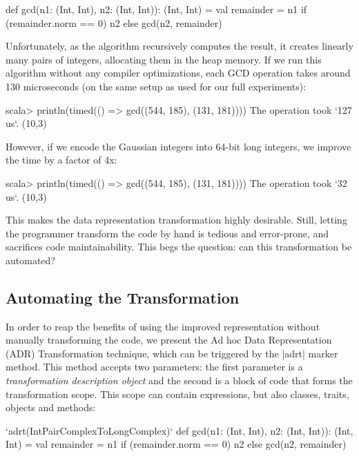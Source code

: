 \begin{lstlisting-nobreak}
def gcd(n1: (Int, Int), n2: (Int, Int)): (Int, Int) = {
  val remainder = n1 %
  if (remainder.norm == 0) n2 else gcd(n2, remainder)
}
\end{lstlisting-nobreak}

Unfortunately, as the algorithm recursively computes the result, it creates linearly many pairs of integers, allocating them in the heap memory. If we run this algorithm without any compiler
optimizations, each GCD operation takes around 130
microseconds (on the same setup as used for our full experiments):

\begin{lstlisting-nobreak}
scala>   println(timed(() => gcd((544, 185), (131, 181))))
The operation took `127 us`.
(10,3)
\end{lstlisting-nobreak}

However, if we encode the Gaussian integers into 64-bit long integers, we improve the time by a factor of 4x:

\begin{lstlisting-nobreak}
scala> println(timed(() => gcd((544, 185), (131, 181))))
The operation took `32 us`.
(10,3)
\end{lstlisting-nobreak}

This makes the data representation transformation highly desirable. Still, letting the programmer transform the code by hand is tedious and error-prone, and sacrifices code maintainability. This begs the question: can this transformation be automated?

\subsection{Automating the Transformation}
\label{sec:automating}

In order to reap the benefits of using the improved representation
without manually transforming the code, we present the Ad hoc Data
Representation (ADR) Transformation technique, which can be triggered
by the |adrt| marker method. This method accepts two parameters: the
first parameter is a \emph{transformation description object} and the
second is a block of code that forms the transformation scope. This
scope can contain expressions, but also classes, traits, objects and
methods:

\begin{lstlisting-nobreak}
`adrt(IntPairComplexToLongComplex)` {
  def gcd(n1: (Int, Int), n2: (Int, Int)): (Int, Int) = {
    val remainder = n1 %
    if (remainder.norm == 0) n2 else gcd(n2, remainder)
  }
}
\end{lstlisting-nobreak}

